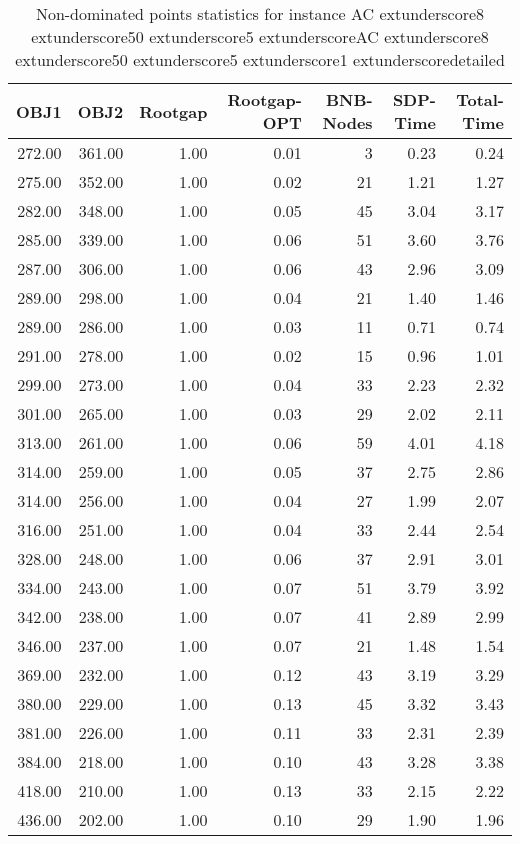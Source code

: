 \begin{table}
\caption{Non-dominated points statistics for instance AC	extunderscore8	extunderscore50	extunderscore5	extunderscoreAC	extunderscore8	extunderscore50	extunderscore5	extunderscore1	extunderscoredetailed}
\label{tab:stats/AC_8_50_5_AC_8_50_5_1_detailed}
\begin{tabular}{rrrrrrr}
\toprule
OBJ1 & OBJ2 & Rootgap & Rootgap-OPT & BNB-Nodes & SDP-Time & Total-Time \\
\midrule
272.00 & 361.00 & 1.00 & 0.01 & 3 & 0.23 & 0.24 \\
275.00 & 352.00 & 1.00 & 0.02 & 21 & 1.21 & 1.27 \\
282.00 & 348.00 & 1.00 & 0.05 & 45 & 3.04 & 3.17 \\
285.00 & 339.00 & 1.00 & 0.06 & 51 & 3.60 & 3.76 \\
287.00 & 306.00 & 1.00 & 0.06 & 43 & 2.96 & 3.09 \\
289.00 & 298.00 & 1.00 & 0.04 & 21 & 1.40 & 1.46 \\
289.00 & 286.00 & 1.00 & 0.03 & 11 & 0.71 & 0.74 \\
291.00 & 278.00 & 1.00 & 0.02 & 15 & 0.96 & 1.01 \\
299.00 & 273.00 & 1.00 & 0.04 & 33 & 2.23 & 2.32 \\
301.00 & 265.00 & 1.00 & 0.03 & 29 & 2.02 & 2.11 \\
313.00 & 261.00 & 1.00 & 0.06 & 59 & 4.01 & 4.18 \\
314.00 & 259.00 & 1.00 & 0.05 & 37 & 2.75 & 2.86 \\
314.00 & 256.00 & 1.00 & 0.04 & 27 & 1.99 & 2.07 \\
316.00 & 251.00 & 1.00 & 0.04 & 33 & 2.44 & 2.54 \\
328.00 & 248.00 & 1.00 & 0.06 & 37 & 2.91 & 3.01 \\
334.00 & 243.00 & 1.00 & 0.07 & 51 & 3.79 & 3.92 \\
342.00 & 238.00 & 1.00 & 0.07 & 41 & 2.89 & 2.99 \\
346.00 & 237.00 & 1.00 & 0.07 & 21 & 1.48 & 1.54 \\
369.00 & 232.00 & 1.00 & 0.12 & 43 & 3.19 & 3.29 \\
380.00 & 229.00 & 1.00 & 0.13 & 45 & 3.32 & 3.43 \\
381.00 & 226.00 & 1.00 & 0.11 & 33 & 2.31 & 2.39 \\
384.00 & 218.00 & 1.00 & 0.10 & 43 & 3.28 & 3.38 \\
418.00 & 210.00 & 1.00 & 0.13 & 33 & 2.15 & 2.22 \\
436.00 & 202.00 & 1.00 & 0.10 & 29 & 1.90 & 1.96 \\
\bottomrule
\end{tabular}
\end{table}
